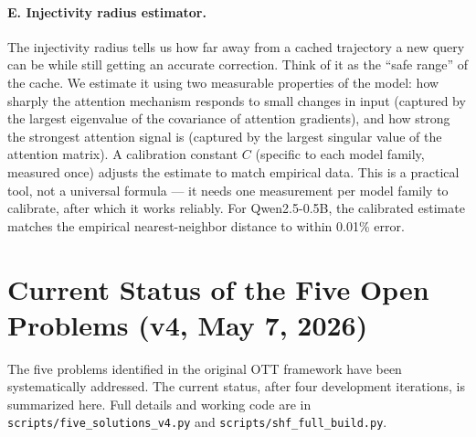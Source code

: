 \documentclass[11pt]{article}
\begin{document}
\paragraph{E. Injectivity radius estimator.} The injectivity radius tells us
how far away from a cached trajectory a new query can be while still getting an
accurate correction. Think of it as the ``safe range'' of the cache. We
estimate it using two measurable properties of the model: how sharply the
attention mechanism responds to small changes in input (captured by the largest
eigenvalue of the covariance of attention gradients), and how strong the
strongest attention signal is (captured by the largest singular value of the
attention matrix). A calibration constant $C$ (specific to each model family,
measured once) adjusts the estimate to match empirical data. This is a
practical tool, not a universal formula — it needs one measurement per model
family to calibrate, after which it works reliably. For Qwen2.5-0.5B, the
calibrated estimate matches the empirical nearest-neighbor distance to within
0.01\% error.

\section{Current Status of the Five Open Problems (v4, May 7, 2026)}

The five problems identified in the original OTT framework have been
systematically addressed. The current status, after four development
iterations, is summarized here. Full details and working code are in
\texttt{scripts/five\_solutions\_v4.py} and \texttt{scripts/shf\_full\_build.py}.
\end{document}
